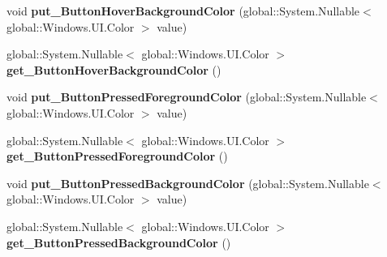 \begin{DoxyCompactItemize}
void {\bfseries put\+\_\+\+Button\+Hover\+Background\+Color} (global\+::\+System.\+Nullable$<$ global\+::\+Windows.\+U\+I.\+Color $>$ value)
\item 
\mbox{\label{interface_windows_1_1_u_i_1_1_view_management_1_1_i_application_view_title_bar_aedbbe25029f1110ca3e011445e1c6f20}} 
global\+::\+System.\+Nullable$<$ global\+::\+Windows.\+U\+I.\+Color $>$ {\bfseries get\+\_\+\+Button\+Hover\+Background\+Color} ()
\item 
\mbox{\label{interface_windows_1_1_u_i_1_1_view_management_1_1_i_application_view_title_bar_a29ef0f6fbb437d94eb34a95316b5cdba}} 
void {\bfseries put\+\_\+\+Button\+Pressed\+Foreground\+Color} (global\+::\+System.\+Nullable$<$ global\+::\+Windows.\+U\+I.\+Color $>$ value)
\item 
\mbox{\label{interface_windows_1_1_u_i_1_1_view_management_1_1_i_application_view_title_bar_a8ad9bacae46b56506f81e856ff93f8d1}} 
global\+::\+System.\+Nullable$<$ global\+::\+Windows.\+U\+I.\+Color $>$ {\bfseries get\+\_\+\+Button\+Pressed\+Foreground\+Color} ()
\item 
\mbox{\label{interface_windows_1_1_u_i_1_1_view_management_1_1_i_application_view_title_bar_a7df9d3750dbac43519af7a923427c6a4}} 
void {\bfseries put\+\_\+\+Button\+Pressed\+Background\+Color} (global\+::\+System.\+Nullable$<$ global\+::\+Windows.\+U\+I.\+Color $>$ value)
\item 
\mbox{\label{interface_windows_1_1_u_i_1_1_view_management_1_1_i_application_view_title_bar_a4ec8314801899bbfbf8d65f31a72dd93}} 
global\+::\+System.\+Nullable$<$ global\+::\+Windows.\+U\+I.\+Color $>$ {\bfseries get\+\_\+\+Button\+Pressed\+Background\+Color} ()
\item 
\mbox{\label{interface_windows_1_1_u_i_1_1_view_management_1_1_i_application_view_title_bar_a7096145457d6fdaffba225526f91e0eb}} 

\end{DoxyCompactItemize}

